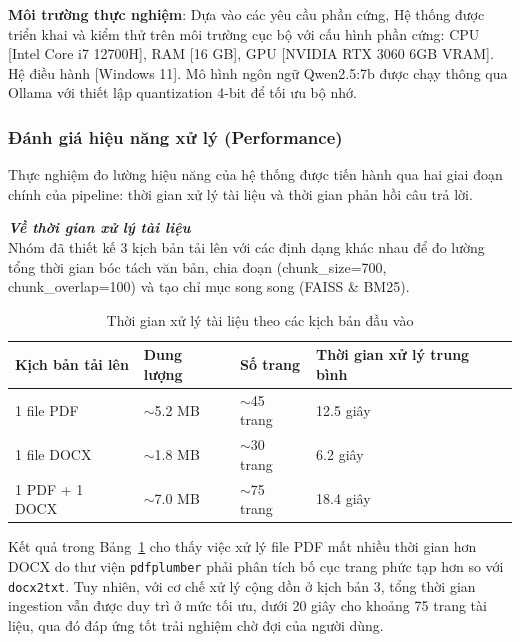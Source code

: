 \documentclass[10pt, conference, a4paper, compsocconf]{IEEEtran}
\begin{document}
\textbf{Môi trường thực nghiệm}: Dựa vào các yêu cầu phần cứng, Hệ thống được triển khai và kiểm thử trên môi trường cục bộ với cấu hình phần cứng: CPU [Intel Core i7 12700H], RAM [16 GB], GPU [NVIDIA RTX 3060 6GB VRAM]. Hệ điều hành [Windows 11]. Mô hình ngôn ngữ Qwen2.5:7b được chạy thông qua Ollama với thiết lập quantization 4-bit để tối ưu bộ nhớ.

\vspace{1 em}
\subsubsection{Đánh giá hiệu năng xử lý (Performance)} Thực nghiệm đo lường hiệu năng của hệ thống được tiến hành qua hai giai đoạn chính của pipeline: thời gian xử lý tài liệu và thời gian phản hồi câu trả lời.

\vspace{0.5em}
\textit{\textbf{Về thời gian xử lý tài liệu}}\\
Nhóm đã thiết kế 3 kịch bản tải lên với các định dạng khác nhau để đo lường tổng thời gian bóc tách văn bản, chia đoạn (chunk\_size=700, chunk\_overlap=100) và tạo chỉ mục song song (FAISS \& BM25).

\begin{table}[H]
  \renewcommand{\arraystretch}{1.15}
  \caption{Thời gian xử lý tài liệu theo các kịch bản đầu vào}
  \label{tab:ingestion-time}
  \centering
  \scriptsize
  \setlength{\tabcolsep}{2.5pt}
  \begin{tabular}{|p{}|p{}|p{}|p{}|}
    \hline
    \textbf{Kịch bản tải lên} & \textbf{Dung lượng} & \textbf{Số trang} & \textbf{Thời gian xử lý trung bình} \\
    \hline
    1 file PDF & $\sim$5.2 MB & $\sim$45 trang & 12.5 giây \\
    \hline
    1 file DOCX & $\sim$1.8 MB & $\sim$30 trang & 6.2 giây \\
    \hline
    1 PDF + 1 DOCX & $\sim$7.0 MB & $\sim$75 trang & 18.4 giây \\
    \hline
  \end{tabular}
\end{table}

Kết quả trong Bảng~\ref{tab:ingestion-time} cho thấy việc xử lý file PDF mất nhiều thời gian hơn DOCX do thư viện \texttt{pdfplumber} phải phân tích bố cục trang phức tạp hơn so với \texttt{docx2txt}. Tuy nhiên, với cơ chế xử lý cộng dồn ở kịch bản 3, tổng thời gian ingestion vẫn được duy trì ở mức tối ưu, dưới 20 giây cho khoảng 75 trang tài liệu, qua đó đáp ứng tốt trải nghiệm chờ đợi của người dùng.
\end{document}
